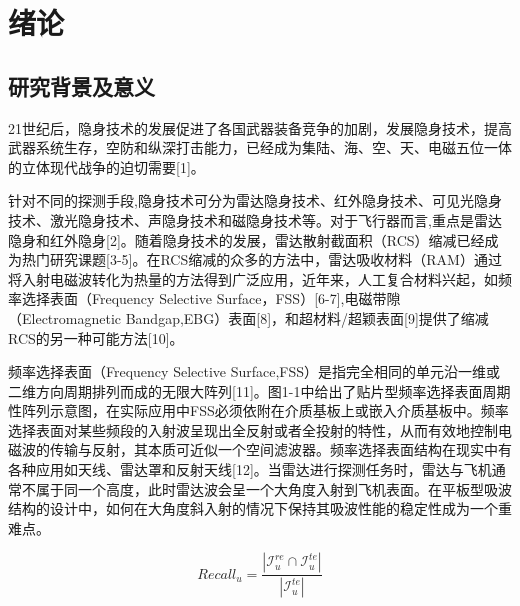 \section{绪论}

\subsection{研究背景及意义}

21世纪后\cite{rendle2009bpr}，隐身技术的发展促进了各国武器装备竞争的加剧，发展隐身技术，提高武器系统生存，空防和纵深打击能力，已经成为集陆、海、空、天、电磁五位一体的立体现代战争的迫切需要[1]。

针对不同的探测手段,隐身技术可分为雷达隐身技术、红外隐身技术、可见光隐身技术、激光隐身技术、声隐身技术和磁隐身技术等。对于飞行器而言,重点是雷达隐身和红外隐身[2]。随着隐身技术的发展，雷达散射截面积（RCS）缩减已经成为热门研究课题[3-5]。在RCS缩减的众多的方法中，雷达吸收材料（RAM）通过将入射电磁波转化为热量的方法得到广泛应用，近年来，人工复合材料兴起，如频率选择表面（Frequency Selective Surface，FSS）[6-7],电磁带隙（Electromagnetic Bandgap,EBG）表面[8]，和超材料/超颖表面[9]提供了缩减RCS的另一种可能方法[10]。

频率选择表面（Frequency Selective Surface,FSS）是指完全相同的单元沿一维或二维方向周期排列而成的无限大阵列[11]。图1-1中给出了贴片型频率选择表面周期性阵列示意图，在实际应用中FSS必须依附在介质基板上或嵌入介质基板中。频率选择表面对某些频段的入射波呈现出全反射或者全投射的特性，从而有效地控制电磁波的传输与反射，其本质可近似一个空间滤波器。频率选择表面结构在现实中有各种应用如天线、雷达罩和反射天线[12]。当雷达进行探测任务时，雷达与飞机通常不属于同一个高度，此时雷达波会呈一个大角度入射到飞机表面。在平板型吸波结构的设计中，如何在大角度斜入射的情况下保持其吸波性能的稳定性成为一个重难点。

\begin{equation}
    Recall_u = \frac{|\mathcal{I}_u^{re} \cap \mathcal{I}_u^{te}|}{|\mathcal{I}_u^{te}|}
    \end{equation}